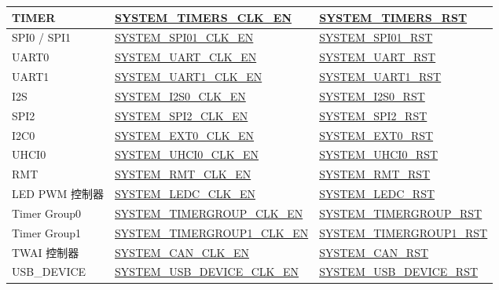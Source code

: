 \documentclass[main\_\_CN.tex]{subfiles}
\begin{document}
\begin{ThreePartTable}
\begin{longtable}[c]{ |l|l|l| }
    TIMER    & \hyperref[fielddesc:SYSTEMTIMERSCLKEN]{SYSTEM\_TIMERS\_CLK\_EN} & \hyperref[fielddesc:SYSTEMTIMERSRST]{SYSTEM\_TIMERS\_RST} \\\hline
    SPI0 / SPI1     & \hyperref[fielddesc:SYSTEMSPI01CLKEN]{SYSTEM\_SPI01\_CLK\_EN}         & \hyperref[fielddesc:SYSTEMSPI01RST]{SYSTEM\_SPI01\_RST} \\\hline
    UART0           & \hyperref[fielddesc:SYSTEMUARTCLKEN]{SYSTEM\_UART\_CLK\_EN}          & \hyperref[fielddesc:SYSTEMUARTRST]{SYSTEM\_UART\_RST} \\\hline
    UART1           & \hyperref[fielddesc:SYSTEMUART1CLKEN]{SYSTEM\_UART1\_CLK\_EN}         & \hyperref[fielddesc:SYSTEMUART1RST]{SYSTEM\_UART1\_RST} \\\hline
    I2S            & \hyperref[fielddesc:SYSTEMI2S0CLKEN]{SYSTEM\_I2S0\_CLK\_EN}         & \hyperref[fielddesc:SYSTEMI2S0RST]{SYSTEM\_I2S0\_RST} \\\hline
    SPI2            & \hyperref[fielddesc:SYSTEMSPI2CLKEN]{SYSTEM\_SPI2\_CLK\_EN}          & \hyperref[fielddesc:SYSTEMSPI2RST]{SYSTEM\_SPI2\_RST} \\\hline
    I2C0            & \hyperref[fielddesc:SYSTEMEXT0CLKEN]{SYSTEM\_EXT0\_CLK\_EN}          & \hyperref[fielddesc:SYSTEMEXT0RST]{SYSTEM\_EXT0\_RST} \\\hline
    UHCI0           & \hyperref[fielddesc:SYSTEMUHCI0CLKEN]{SYSTEM\_UHCI0\_CLK\_EN}         & \hyperref[fielddesc:SYSTEMUHCI0RST]{SYSTEM\_UHCI0\_RST} \\\hline
    RMT             & \hyperref[fielddesc:SYSTEMRMTCLKEN]{SYSTEM\_RMT\_CLK\_EN}           & \hyperref[fielddesc:SYSTEMRMTRST]{SYSTEM\_RMT\_RST} \\\hline
    LED PWM 控制器 & \hyperref[fielddesc:SYSTEMLEDCCLKEN]{SYSTEM\_LEDC\_CLK\_EN}          & \hyperref[fielddesc:SYSTEMLEDCRST]{SYSTEM\_LEDC\_RST} \\\hline
    Timer Group0    & \hyperref[fielddesc:SYSTEMTIMERGROUPCLKEN]{SYSTEM\_TIMERGROUP\_CLK\_EN} & \hyperref[fielddesc:SYSTEMTIMERGROUPRST]{SYSTEM\_TIMERGROUP\_RST} \\\hline
    Timer Group1    & \hyperref[fielddesc:SYSTEMTIMERGROUP1CLKEN]{SYSTEM\_TIMERGROUP1\_CLK\_EN} & \hyperref[fielddesc:SYSTEMTIMERGROUP1RST]{SYSTEM\_TIMERGROUP1\_RST} \\\hline
    TWAI 控制器    & \hyperref[fielddesc:SYSTEMCANCLKEN]{SYSTEM\_CAN\_CLK\_EN} & \hyperref[fielddesc:SYSTEMCANRST]{SYSTEM\_CAN\_RST} \\\hline
    USB\_DEVICE    & \hyperref[fielddesc:SYSTEMUSBDEVICECLKEN]{SYSTEM\_USB\_DEVICE\_CLK\_EN} & \hyperref[fielddesc:SYSTEMUSBDEVICERST]{SYSTEM\_USB\_DEVICE\_RST} \\\hline

\end{longtable}
\end{ThreePartTable}
\end{document}
